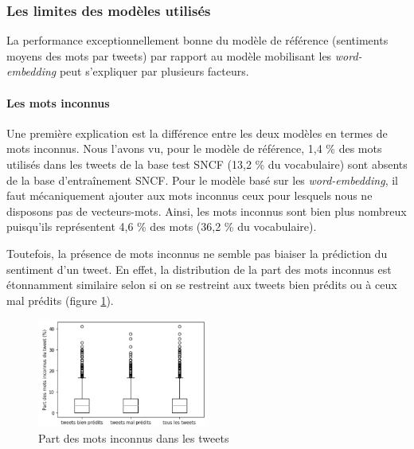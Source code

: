 \documentclass[11pt,french,french]{article}
\begin{document}
\hypertarget{les-limites-des-moduxe8les-utilisuxe9s}{%
\subsubsection{Les limites des modèles utilisés}\label{les-limites-des-moduxe8les-utilisuxe9s}}

La performance exceptionnellement bonne du modèle de référence (sentiments moyens des mots par tweets) par rapport au modèle mobilisant les \emph{word-embedding} peut s'expliquer par plusieurs facteurs.

\hypertarget{les-mots-inconnus}{%
\paragraph{Les mots inconnus}\label{les-mots-inconnus}}

Une première explication est la différence entre les deux modèles en termes de mots inconnus.
Nous l'avons vu, pour le modèle de référence, 1,4 \% des mots utilisés dans les tweets de la base test SNCF (13,2 \% du vocabulaire) sont absents de la base d'entraînement SNCF.
Pour le modèle basé sur les \emph{word-embedding}, il faut mécaniquement ajouter aux mots inconnus ceux pour lesquels nous ne disposons pas de vecteurs-mots.
Ainsi, les mots inconnus sont bien plus nombreux puisqu'ils représentent 4,6 \% des mots (36,2 \% du vocabulaire).

Toutefois, la présence de mots inconnus ne semble pas biaiser la prédiction du sentiment d'un tweet.
En effet, la distribution de la part des mots inconnus est étonnamment similaire selon si on se restreint aux tweets bien prédits ou à ceux mal prédits (figure \ref{fig:mots_inconnus}).

\begin{figure}[ht]
\begin{center}
\includegraphics[width=0.5\textwidth]{img/mots_inconnus.png}
\captionsetup{margin=0cm,format=hang,justification=justified}
\caption{Part des mots inconnus dans les tweets}\label{fig:mots_inconnus}
\end{center}
\end{figure}
\end{document}
